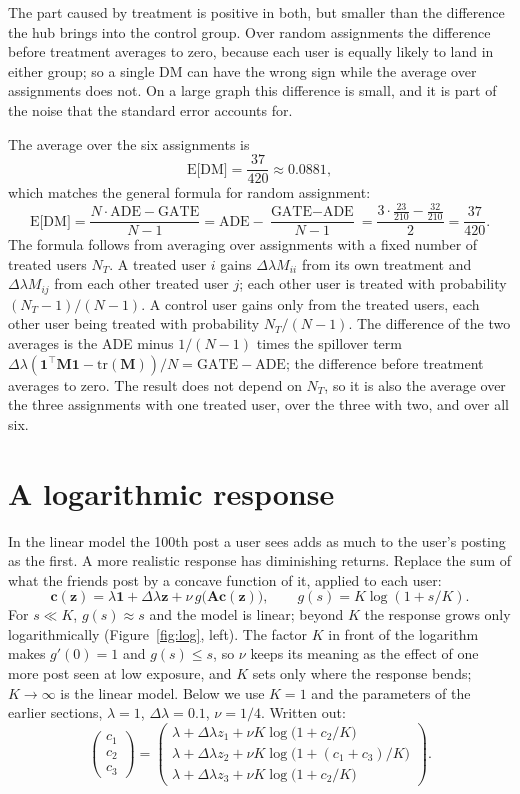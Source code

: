 \documentclass[11pt]{article}
\newcommand{\one}{\mathbf{1}}
\newcommand{\vc}{\boldsymbol{c}}
\newcommand{\vz}{\boldsymbol{z}}
\newcommand{\mA}{\mathbf{A}}
\newcommand{\mM}{\mathbf{M}}
\begin{document}
The part caused by treatment is positive in both, but smaller than the difference the hub brings into the control group.  Over random assignments the difference before treatment averages to zero, because each user is equally likely to land in either group; so a single DM can have the wrong sign while the average over assignments does not.  On a large graph this difference is small, and it is part of the noise that the standard error accounts for.

The average over the six assignments is
\[
\text{E[DM]} = \frac{37}{420} \approx 0.0881 ,
\]
which matches the general formula for random assignment:
\[
\text{E[DM]} = \frac{N\cdot\text{ADE} - \text{GATE}}{N - 1} = \text{ADE} - \frac{\text{GATE} - \text{ADE}}{N - 1}
= \frac{3\cdot\frac{23}{210} - \frac{32}{210}}{2} = \frac{37}{420} .
\]
The formula follows from averaging over assignments with a fixed number of treated users $N_T$.  A treated user $i$ gains $\Delta\lambda M_{ii}$ from its own treatment and $\Delta\lambda M_{ij}$ from each other treated user $j$; each other user is treated with probability $(N_T - 1)/(N - 1)$.  A control user gains only from the treated users, each other user being treated with probability $N_T/(N - 1)$.  The difference of the two averages is the ADE minus $1/(N - 1)$ times the spillover term $\Delta\lambda(\one^\top\mM\one - \mathrm{tr}(\mM))/N = \text{GATE} - \text{ADE}$; the difference before treatment averages to zero.  The result does not depend on $N_T$, so it is also the average over the three assignments with one treated user, over the three with two, and over all six.


\section{A logarithmic response}

In the linear model the 100th post a user sees adds as much to the user's posting as the first.  A more realistic response has diminishing returns.  Replace the sum of what the friends post by a concave function of it, applied to each user:
\[
\vc(\vz) = \lambda\one + \Delta\lambda\vz + \nu\, g\bigl(\mA\vc(\vz)\bigr),
\qquad
g(s) = K\log(1 + s/K) .
\]
For $s \ll K$, $g(s) \approx s$ and the model is linear; beyond $K$ the response grows only logarithmically (Figure~\ref{fig:log}, left).  The factor $K$ in front of the logarithm makes $g'(0) = 1$ and $g(s) \le s$, so $\nu$ keeps its meaning as the effect of one more post seen at low exposure, and $K$ sets only where the response bends; $K \to \infty$ is the linear model.  Below we use $K = 1$ and the parameters of the earlier sections, $\lambda = 1$, $\Delta\lambda = 0.1$, $\nu = 1/4$.  Written out:
\[
\begin{pmatrix} c_1 \\ c_2 \\ c_3 \end{pmatrix}
=
\begin{pmatrix} \lambda + \Delta\lambda z_1 + \nu K\log\bigl(1 + c_2/K\bigr) \\ \lambda + \Delta\lambda z_2 + \nu K\log\bigl(1 + (c_1 + c_3)/K\bigr) \\ \lambda + \Delta\lambda z_3 + \nu K\log\bigl(1 + c_2/K\bigr) \end{pmatrix}.
\]
\end{document}
